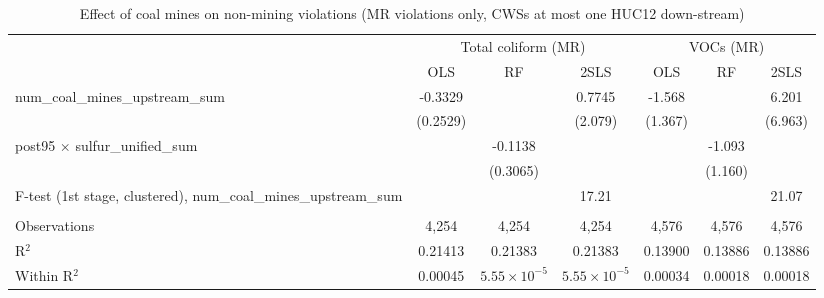 
\begin{table}[htbp]
   
   \caption{\label{2sls_dwnstrm_nonminevio_mr_ivsum} Effect of coal mines on non-mining violations (MR violations only, CWSs at most one HUC12 down-stream)}
   \bigskip
   
   \centering
   
   \begin{adjustbox}{width = \textwidth, center}
      
      
      \begin{tabular}{lcccccc}
         \toprule
         
          & \multicolumn{3}{c}{Total coliform (MR)} & \multicolumn{3}{c}{VOCs (MR)}\\
         
                                                                            & OLS           & RF                    & 2SLS                  & OLS           & RF            & 2SLS\\  
         
         \midrule 
         num\_coal\_mines\_upstream\_sum                                    & -0.3329       &                       & 0.7745                & -1.568        &               & 6.201\\   
                                                                            & (0.2529)      &                       & (2.079)               & (1.367)       &               & (6.963)\\   
         post95 $\times$ sulfur\_unified\_sum                               &               & -0.1138               &                       &               & -1.093        &   \\   
                                                                            &               & (0.3065)              &                       &               & (1.160)       &   \\   
         
         F-test (1st stage, clustered), num\_coal\_mines\_upstream\_sum     &               &                       & 17.21                 &               &               & 21.07\\  
         
          \\
         
         Observations                                                       & 4,254         & 4,254                 & 4,254                 & 4,576         & 4,576         & 4,576\\  
         R$^2$                                                              & 0.21413       & 0.21383               & 0.21383               & 0.13900       & 0.13886       & 0.13886\\  
         Within R$^2$                                                       & 0.00045       & $5.55\times 10^{-5}$  & $5.55\times 10^{-5}$  & 0.00034       & 0.00018       & 0.00018\\  
         

\end{tabular}
\end{adjustbox}
\end{table}
